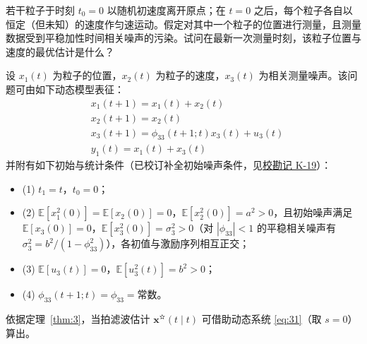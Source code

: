 \begin{example}\label{ex:2}

若干粒子于时刻 $t_0 = 0$ 以随机初速度离开原点；在 $t = 0$ 之后，每个粒子各自以恒定（但未知）的速度作匀速运动。假定对其中一个粒子的位置进行测量，且测量数据受到平稳加性时间相关噪声的污染。试问在最新一次测量时刻，该粒子位置与速度的最优估计是什么？

设 $x_1(t)$ 为粒子的位置，$x_2(t)$ 为粒子的速度，$x_3(t)$ 为相关测量噪声。该问题可由如下动态模型表征：
\begin{equation*}
\begin{aligned}
&x_1(t + 1) = x_1(t) + x_2(t) \\
&x_2(t + 1) = x_2(t) \\
&x_3(t + 1) = \phi_{33}(t + 1; t)x_3(t) + u_3(t) \\
&y_1(t) = x_1(t) + x_3(t)
\end{aligned}
\end{equation*}
并附有如下初始与统计条件（已校订补全初始噪声条件，见\hyperref[sec:k19]{校勘记 K-19}）：

\begin{itemize}
\item (1) $t_1 = t$，$t_0 = 0$；
\item (2) $\mathbb{E}[x_1^2(0)] = \mathbb{E}[x_2(0)] = 0$，$\mathbb{E}[x_2^2(0)] = a^2 > 0$，且初始噪声满足 $\mathbb{E}[x_3(0)] = 0$，$\mathbb{E}[x_3^2(0)] = \sigma_3^2 > 0$（对 $|\phi_{33}| < 1$ 的平稳相关噪声有 $\sigma_3^2 = b^2 / (1 - \phi_{33}^2)$），各初值与激励序列相互正交；
\item (3) $\mathbb{E}[u_3(t)] = 0$，$\mathbb{E}[u_3^2(t)] = b^2 > 0$；
\item (4) $\phi_{33}(t + 1; t) = \phi_{33} = \text{常数}$。
\end{itemize}

依据定理~\ref{thm:3}，当拍滤波估计 $\bm{x}^{\text{✫}}(t \mid t)$ 可借助动态系统 \eqref{eq:31}（取 $s = 0$）算出。


\end{example}
